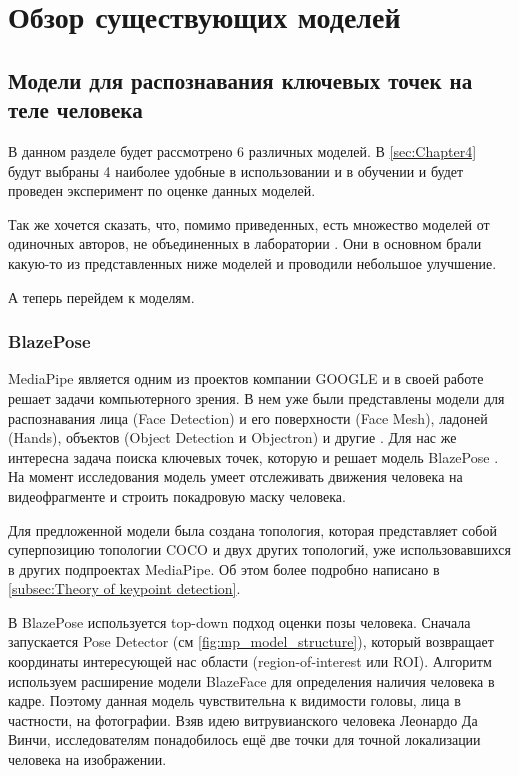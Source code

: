 \section{Обзор существующих моделей}
\label{sec:Chapter2} 

\subsection{Модели для распознавания ключевых точек на теле человека}
\label{subsec:pose_estimation_models}

В данном разделе будет рассмотрено 6 различных моделей. В \autoref{sec:Chapter4} будут выбраны 4 наиболее удобные в использовании и в обучении и будет проведен эксперимент по оценке данных моделей.

Так же хочется сказать, что, помимо приведенных, есть множество моделей от одиночных авторов, не объединенных в лаборатории \cite{pet_recognition, pet_classification}. Они в основном брали какую-то из представленных ниже моделей и проводили небольшое улучшение.

А теперь перейдем к моделям.

\subsubsection{BlazePose}
\label{subsubsec:blazepose_desc}

MediaPipe является одним из проектов компании GOOGLE и в своей работе решает задачи компьютерного зрения. В нем уже были представлены модели для распознавания лица (Face Detection) и его поверхности (Face Mesh), ладоней (Hands), объектов (Object Detection и Objectron) и другие \cite{mediapipe}. Для нас же интересна задача поиска ключевых точек, которую и решает модель BlazePose \cite{BlazePose}. На момент исследования модель умеет отслеживать движения человека на видеофрагменте и строить покадровую маску человека.

Для предложенной модели была создана топология, которая представляет собой суперпозицию топологии COCO и двух других топологий, уже использовавшихся в других подпроектах MediaPipe. Об этом более подробно написано в \autoref{subsec:Theory of keypoint detection}.

В BlazePose используется top-down подход оценки позы человека. Сначала запускается Pose Detector (см \autoref{fig:mp_model_structure}), который возвращает координаты интересующей нас области (region-of-interest или ROI). Алгоритм используем расширение модели BlazeFace для определения наличия человека в кадре. Поэтому данная модель чувствительна к видимости головы, лица в частности, на фотографии. Взяв идею витрувианского человека Леонардо Да Винчи, исследователям понадобилось ещё две точки для точной локализации человека на изображении.

